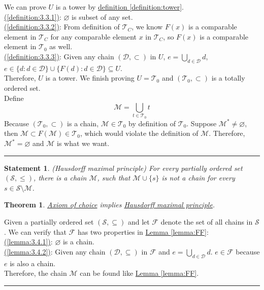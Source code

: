 \documentclass[12pt]{article}
\numberwithin{equation}{section}
\theoremstyle{plain} %
\newtheorem{theorem}[equation]{Theorem}
\newtheorem{statement}[equation]{Statement}
\theoremstyle{definition}
\theoremstyle{remark}
\newenvironment{proof}{{\bf Proof:}}{\hfill\rule{2mm}{2mm}}
\begin{document}
\begin{proof}
We can prove $U$ is a tower by \hyperref[definition:tower]{definition  \ref*{definition:tower}}.  \\
\hyperref[definition:3.3.1]{(\ref*{definition:3.3.1})}: $\varnothing$ is subset of any set. \\  
\hyperref[definition:3.3.2]{(\ref*{definition:3.3.2})}: From definition of $\mathcal{T}_C$, we know $F(x)$ is a comparable element in $\mathcal{T}_C$ for any comparable element $x$ in $\mathcal{T}_C$, so $F(x)$ is a comparable element in $\mathcal{T}_0$ as well. \\
\hyperref[definition:3.3.3]{(\ref*{definition:3.3.3})}: Given any chain $(\mathcal{D}, \subset)$ in $U$, $e = \bigcup_{d \in \mathcal{D}}d$, $e \in \{d: d \in \mathcal{D}\} \cup \{ F(d): d \in \mathcal{D} \} \subseteq U$.\\
Therefore, $U$ is a tower. We finish proving $U = \mathcal{T}_0$ and $(\mathcal{T}_0, \subset)$ is a totally ordered set.  \\
Define  
$$\mathcal{M} = \bigcup_{t \in \mathcal{T}_0}t $$
Because $(\mathcal{T}_0, \subset)$ is a chain, $\mathcal{M} \in \mathcal{T}_0$ by definition of $\mathcal{T}_0$. Suppose $\mathcal{M}^*\neq \varnothing$, then $\mathcal{M} \subset F(\mathcal{M}) \in \mathcal{T}_0$, which would violate the definition of $\mathcal{M}$. Therefore, $\mathcal{M}^*= \varnothing$ and $\mathcal{M}$ is what we want. 
\end{proof}

\begin{statement}
\label{statement:Hausdorff maximal principle}
\textup{(Hausdorff maximal principle)} \textit{For every partially ordered set $(\mathcal{S}, \leq)$, there is a chain $\mathcal{M}$, such that $\mathcal{M} \cup \{s\}$ is not a chain for every $s \in \mathcal{S} \setminus \mathcal{M}$.}
\end{statement}

\begin{theorem}
\hyperref[statement:Axiom of choice]{Axiom of choice} implies \hyperref[statement:Hausdorff maximal principle]{Hausdorff maximal principle}.
\end{theorem}

\begin{proof}
Given a partially ordered set $(\mathcal{S}, \subseteq)$ and let $\mathcal{F}$ denote the set of all chains in $\mathcal{S}$. We can verify that $\mathcal{F}$ has two properties in \hyperref[lemma:FF]{Lemma \ref*{lemma:FF}}: \\
\hyperref[lemma:3.4.1]{(\ref*{lemma:3.4.1})}: $\varnothing$ is a chain. \\  
\hyperref[lemma:3.4.2]{(\ref*{lemma:3.4.2})}: Given any chain $(\mathcal{D}, \subseteq)$ in $\mathcal{F}$ and $e = \bigcup_{d \in \mathcal{D}}d$. $e \in \mathcal{F}$ because $e$ is also a chain.\\
Therefore, the chain $\mathcal{M}$ can be found like \hyperref[lemma:FF]{Lemma \ref*{lemma:FF}}. 
\end{proof}
\end{document}
